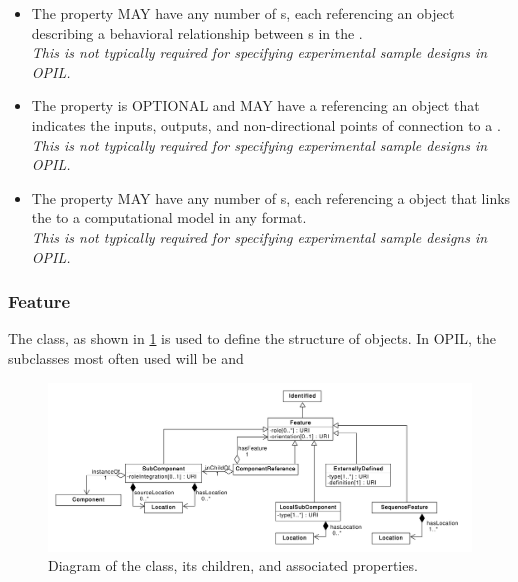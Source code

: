 \begin{itemize}
\item \label{sec:sbol:hasInteraction}
The  property MAY have any number of s, each referencing an  object describing a behavioral relationship between s in the .
\\{\em This is not typically required for specifying experimental sample designs in OPIL.}

\item \label{sec:sbol:hasInterface}
The  property is OPTIONAL and MAY have a  referencing an  object that indicates the inputs, outputs, and non-directional points of connection to a .
\\{\em This is not typically required for specifying experimental sample designs in OPIL.}

\item \label{sec:sbol:hasModel}
The  property MAY have any number of s, each referencing a  object that links the  to a computational model in any format.
\\{\em This is not typically required for specifying experimental sample designs in OPIL.}
\end{itemize}

\subsubsection{Feature}
\label{sec:sbol:Feature}

The  class, as shown in \ref{uml:subcomponent} is used to define the structure of  objects.
In OPIL, the  subclasses most often used will be  and 

\begin{figure}[ht]
\begin{center}
\includegraphics[width=\textwidth]{sbol_uml/feature}
\caption[]{Diagram of the  class, its children, and associated properties.}
\label{uml:subcomponent}
\end{center}
\end{figure}

